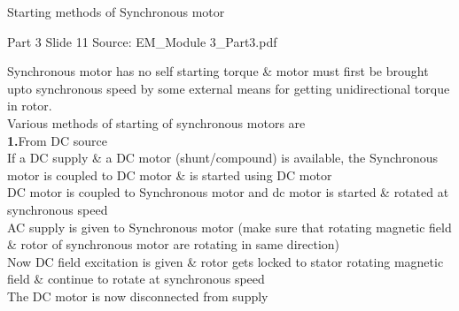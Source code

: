 \documentclass[11pt,a4paper]{article}
\begin{document}
\begin{mdframed}[roundcorner=9pt,backgroundcolor=white,linecolor=anthBlue,linewidth=1pt,innerleftmargin=12pt,innerrightmargin=12pt,innertopmargin=10pt,innerbottommargin=10pt,skipabove=8pt,skipbelow=10pt]
{\HeadingFont\fontsize{15}{18}\selectfont\color{anthDark}Starting methods of Synchronous motor\par}
{\color{anthMid}\small Part 3 \textbullet{} Slide 11 \textbullet{} Source: EM\_Module 3\_Part3.pdf\par}
\vspace{0.5em}
{\small
\textcolor{anthBlue}{\textbullet}\hspace{0.65em}Synchronous motor has no self starting torque \& motor must first be brought upto synchronous speed by some external means for getting unidirectional torque in rotor.\\
\textcolor{anthBlue}{\textbullet}\hspace{0.65em}Various methods of starting of synchronous motors are\\
\textcolor{anthBlue}{\textbf{1.}}\hspace{0.5em}From DC source\\
\textcolor{anthBlue}{\textbullet}\hspace{0.65em}If a DC supply \& a DC motor (shunt/compound) is available, the Synchronous motor is coupled to DC motor \& is started using DC motor\\
\textcolor{anthBlue}{\textbullet}\hspace{0.65em}DC motor is coupled to Synchronous motor and dc motor is started \& rotated at synchronous speed\\
\textcolor{anthBlue}{\textbullet}\hspace{0.65em}AC supply is given to Synchronous motor (make sure that rotating magnetic field \& rotor of synchronous motor are rotating in same direction)\\
\textcolor{anthBlue}{\textbullet}\hspace{0.65em}Now DC field excitation is given \& rotor gets locked to stator rotating magnetic field \& continue to rotate at synchronous speed\\
\textcolor{anthBlue}{\textbullet}\hspace{0.65em}The DC motor is now disconnected from supply\\

}
\end{mdframed}
\end{document}
